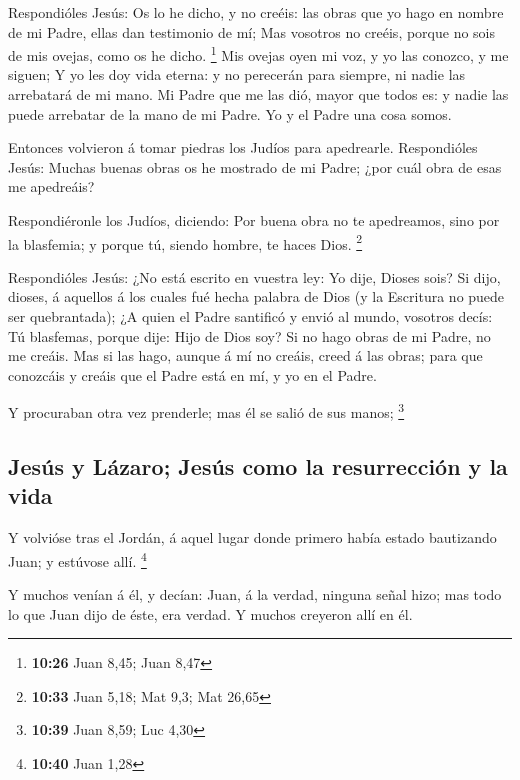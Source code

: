  Respondióles Jesús: Os lo he dicho, y no creéis: las obras
que yo hago en nombre de mi Padre, ellas dan testimonio de mí;
 Mas vosotros no creéis, porque no sois de mis ovejas, como
os he dicho. \footnote{\textbf{10:26} Juan 8,45; Juan 8,47}
 Mis ovejas oyen mi voz, y yo las conozco, y me siguen;
 Y yo les doy vida eterna: y no perecerán para siempre, ni
nadie las arrebatará de mi mano.  Mi Padre que me las dió,
mayor que todos es: y nadie las puede arrebatar de la mano de mi Padre.
 Yo y el Padre una cosa somos.

 Entonces volvieron á tomar piedras los Judíos para
apedrearle.  Respondióles Jesús: Muchas buenas obras os he
mostrado de mi Padre; ¿por cuál obra de esas me apedreáis?

 Respondiéronle los Judíos, diciendo: Por buena obra no te
apedreamos, sino por la blasfemia; y porque tú, siendo hombre, te haces
Dios. \footnote{\textbf{10:33} Juan 5,18; Mat 9,3; Mat 26,65}

 Respondióles Jesús: ¿No está escrito en vuestra ley: Yo
dije, Dioses sois?  Si dijo, dioses, á aquellos á los
cuales fué hecha palabra de Dios (y la Escritura no puede ser
quebrantada);  ¿A quien el Padre santificó y envió al
mundo, vosotros decís: Tú blasfemas, porque dije: Hijo de Dios soy?
 Si no hago obras de mi Padre, no me creáis. 
Mas si las hago, aunque á mí no creáis, creed á las obras; para que
conozcáis y creáis que el Padre está en mí, y yo en el Padre.

 Y procuraban otra vez prenderle; mas él se salió de sus
manos; \footnote{\textbf{10:39} Juan 8,59; Luc 4,30}

\hypertarget{jesuxfas-y-luxe1zaro-jesuxfas-como-la-resurrecciuxf3n-y-la-vida}{%
\subsection{Jesús y Lázaro; Jesús como la resurrección y la
vida}\label{jesuxfas-y-luxe1zaro-jesuxfas-como-la-resurrecciuxf3n-y-la-vida}}

 Y volvióse tras el Jordán, á aquel lugar donde primero
había estado bautizando Juan; y estúvose allí. \footnote{\textbf{10:40}
  Juan 1,28}

 Y muchos venían á él, y decían: Juan, á la verdad, ninguna
señal hizo; mas todo lo que Juan dijo de éste, era verdad. 
Y muchos creyeron allí en él.


